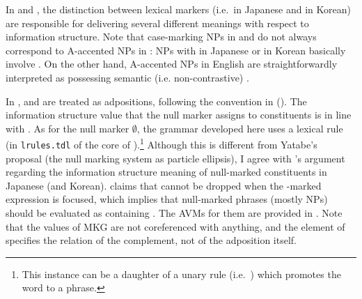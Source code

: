 In  and , the distinction between lexical
markers (i.e.\ \ga \vs \wa in Japanese and \ika \vs \nun in Korean)
are responsible for delivering several different meanings with respect
to information structure. Note that case-marking NPs in  and
 do not always correspond to A-accented NPs in
: NPs with \ga in Japanese or \ika in Korean
basically involve . On the other hand, A-accented NPs
in English are straightforwardly interpreted as possessing semantic
(i.e. non-contrastive) .









In , \ga and \wa are treated as adpositions,
following the convention in  (\citealt{siegel:etal:16}).
The information structure value that the null marker assigns to
constituents is in line with \citet{yatabe:99}.  As for the null
marker \ensuremath{\emptyset}, the grammar developed here uses a lexical rule (in
\texttt{lrules.tdl} of the core of \lingo {}).\footnote{This instance can be a daughter of a unary rule
  (i.e.\ ) which promotes the word to a phrase.}
Although this is different from Yatabe's proposal (the null marking
system as particle ellipsis), I agree with \citeauthor{yatabe:99}'s
argument regarding the information structure meaning of null-marked
constituents in Japanese (and Korean). \citeauthor{yatabe:99} claims
that \ga cannot be dropped when the {\ga}-marked expression is
focused, which implies that null-marked phrases (mostly NPs) should be
evaluated as containing .  The AVMs for them are
provided in . Note that the values
of MKG are not coreferenced with anything, and the element of
 specifies the relation of the complement, not of the
adposition itself.




